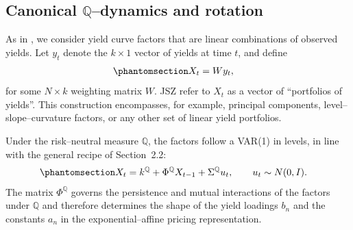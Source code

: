 \documentclass[
  letterpaper,
  DIV=11,
  numbers=noendperiod]{scrreprt}
\begin{document}
\subsection*{\texorpdfstring{Canonical \(\mathbb{Q}\)--dynamics and
rotation}{Canonical \textbackslash mathbb\{Q\}--dynamics and rotation}}\label{canonical-mathbbqdynamics-and-rotation}

As in , we consider yield curve factors that are linear combinations of
observed yields. Let \(y_t\) denote the \(k\times 1\) vector of yields
at time \(t\), and define
\begin{equation}\protect\phantomsection\label{eq-JSZ-portfolio-factors}{
\begin{align}
X_t &= W y_t,
\end{align}
}\end{equation} for some \(N\times k\) weighting matrix \(W\). JSZ refer
to \(X_t\) as a vector of ``portfolios of yields''. This construction
encompasses, for example, principal components, level--slope--curvature
factors, or any other set of linear yield portfolios.

Under the risk--neutral measure \(\mathbb{Q}\), the factors follow a
VAR(1) in levels, in line with the general recipe of Section~2.2:
\begin{equation}\protect\phantomsection\label{eq-JSZ-coreVAR}{
\begin{align}
X_t &= k^{\mathbb{Q}} + \Phi^{\mathbb{Q}} X_{t-1}
        + \Sigma^{\mathbb{Q}} u_t, \qquad u_t \sim N(0,I).
\end{align}
}\end{equation} The matrix \(\Phi^{\mathbb{Q}}\) governs the persistence
and mutual interactions of the factors under \(\mathbb{Q}\) and
therefore determines the shape of the yield loadings \(b_n\) and the
constants \(a_n\) in the exponential--affine pricing representation.
\end{document}
